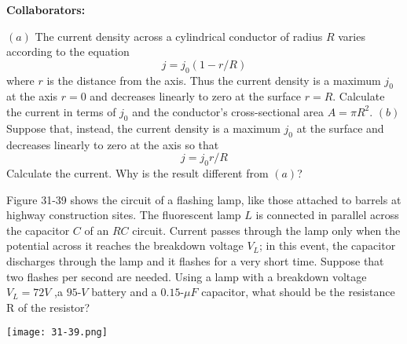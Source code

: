 \documentclass[11pt,letterpaper,boxed]{hmcpset}
\begin{document}
\noindent\textbf{Collaborators:} 


\begin{problem}
$(a)$ The current density across a cylindrical conductor of radius $R$ varies according to the equation
$$ j = j_0(1-r/R)$$
where $r$ is the distance from the axis. Thus the current density is a maximum $j_0$ at the axis $r=0$ and decreases linearly to zero at the surface $r=R$. Calculate the current in terms of $j_0$ and the conductor's cross-sectional area $A= \pi R^2$. $(b)$ Suppose that, instead, the current density is a maximum $j_0$ at the surface and decreases linearly to zero at the axis so that $$ j = j_0r/R$$ Calculate the current. Why is the result different from $(a)$?
\end{problem}

\begin{solution}
\vfill
\end{solution}
\newpage

\begin{problem}[HRK 31.47]
Figure 31-39 shows the circuit of a flashing lamp, like those attached to barrels at highway construction sites. The fluorescent lamp $L$ is connected in parallel across the capacitor $C$ of an $RC$ circuit. Current passes through the lamp only when the potential across it reaches the breakdown voltage $V_L$; in this event, the capacitor discharges through the lamp and it flashes for a very short time. Suppose that two flashes per second are needed. Using a lamp with a breakdown voltage $V_L = 72 V$ ,a $ 95$-$V$ battery and a $0.15$-$\mu F$ capacitor, what should be the resistance R of the resistor? 
\begin{center}
\texttt{[image: 31-39.png]}
\end{center}
\end{problem}

\begin{solution}
\vfill
\end{solution}
\newpage
\end{document}
